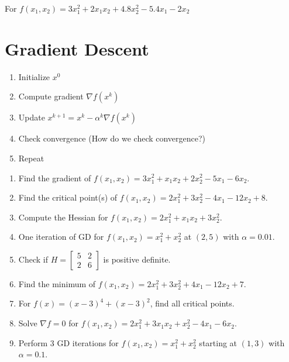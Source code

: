 \documentclass[11pt,a4paper]{article}
\theoremstyle{definition}
\begin{document}
\begin{quesbox}
For $f(x_1,x_2)=3x_1^2+2x_1x_2+4.8x_2^2-5.4x_1-2x_2$
\end{quesbox}

\section*{Gradient Descent}

\begin{enumerate}
  \item Initialize $x^0$
  \item Compute gradient $\nabla f(x^k)$
  \item Update $x^{k+1} = x^k - \alpha^k \nabla f(x^k)$
  \item Check convergence (How do we check convergence?)
  \item Repeat
\end{enumerate}

\begin{quesbox}
\begin{enumerate}
  \item Find the gradient of $f(x_1,x_2)=3x_1^2+x_1x_2+2x_2^2-5x_1-6x_2$.
  \item Find the critical point(s) of $f(x_1,x_2)=2x_1^2+3x_2^2-4x_1-12x_2+8$.
  \item Compute the Hessian for $f(x_1,x_2)=2x_1^2+x_1x_2+3x_2^2$.
  \item One iteration of GD for $f(x_1,x_2)=x_1^2+x_2^2$ at $(2,5)$ with $\alpha=0.01$.
  \item Check if $H=\begin{bmatrix}5&2\\2&6\end{bmatrix}$ is positive definite.
  \item Find the minimum of $f(x_1,x_2)=2x_1^2+3x_2^2+4x_1-12x_2+7$.
  \item For $f(x)=(x-3)^4+(x-3)^2$, find all critical points.
  \item Solve $\nabla f=0$ for $f(x_1,x_2)=2x_1^2+3x_1x_2+x_2^2-4x_1-6x_2$.
  \item Perform 3 GD iterations for $f(x_1,x_2)=x_1^2+x_2^2$ starting at $(1,3)$ with $\alpha=0.1$.
\end{enumerate}
\end{quesbox}
\end{document}
